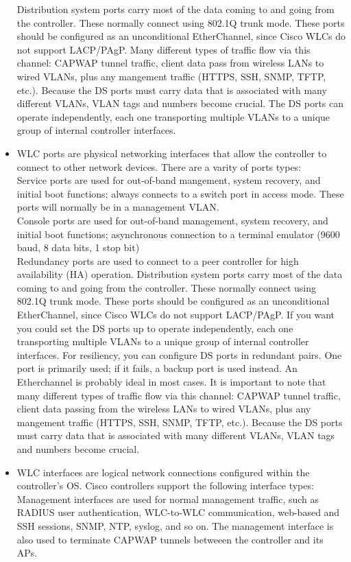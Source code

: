 \documentclass{article}
\begin{document}
\begin{itemize}
		Distribution system ports carry most of the data coming to and going from the controller. These normally connect using 802.1Q trunk mode. These ports should be configured as an unconditional EtherChannel, since Cisco WLCs do not support LACP/PAgP. Many different types of traffic flow via this channel: CAPWAP tunnel traffic, client data pass from wireless LANs to wired VLANs, plus any mangement traffic (HTTPS, SSH, SNMP, TFTP, etc.). Because the DS ports must carry data that is associated with many different VLANs, VLAN tags and numbers become crucial. The DS ports can operate independently, each one transporting multiple VLANs to a unique group of internal controller interfaces.		
  	\item[] WLC ports are physical networking interfaces that allow the controller to connect to other network devices. There are a varity of ports types:\\
		Service ports are used for out-of-band mangement, system recovery, and initial boot functions; always connects to a switch port in access mode. These ports will normally be in a management VLAN.\\
		Console ports are used for out-of-band management, system recovery, and initial boot functions; asynchronous connection to a terminal emulator (9600 baud, 8 data bits, 1 stop bit)\\
		Redundancy ports are used to connect to a peer controller for high availability (HA) operation.
		Distribution system ports carry most of the data coming to and going from the controller. These normally connect using 802.1Q trunk mode. These ports should be configured as an unconditional EtherChannel, since Cisco WLCs do not support LACP/PAgP. If you want you could set the DS ports up to operate independently, each one transporting multiple VLANs to a unique group of internal controller interfaces. For resiliency, you can configure DS ports in redundant pairs. One port is primarily used; if it fails, a backup port is used instead. An Etherchannel is probably ideal in most cases. It is important to note that many different types of traffic flow via this channel: CAPWAP tunnel traffic, client data passing from the wireless LANs to wired VLANs, plus any mangement traffic (HTTPS, SSH, SNMP, TFTP, etc.). Because the DS ports must carry data that is associated with many different VLANs, VLAN tags and numbers become crucial.
  	\item[] WLC interfaces are logical network connections configured within the controller's OS. Cisco controllers support the following interface types:\\
		Management interfaces are used for normal management traffic, such as RADIUS user authentication, WLC-to-WLC communication, web-based and SSH sessions, SNMP, NTP, syslog, and so on. The management interface is also used to terminate CAPWAP tunnels betweeen the controller and its APs.\\
		

\end{itemize}
\end{document}
